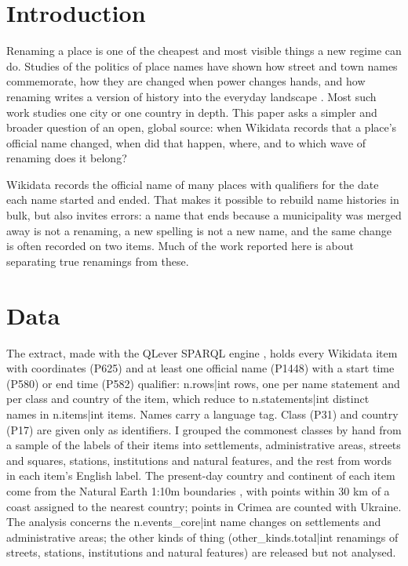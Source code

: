 \documentclass[11pt,a4paper]{article}
\begin{document}
\section{Introduction}
Renaming a place is one of the cheapest and most visible things a new regime can do. Studies of the politics of place names have shown how street and town names commemorate, how they are changed when power changes hands, and how renaming writes a version of history into the everyday landscape \citep{azaryahu1996,roseredwood2010,light2004}. Most such work studies one city or one country in depth. This paper asks a simpler and broader question of an open, global source: when Wikidata records that a place's official name changed, when did that happen, where, and to which wave of renaming does it belong?

Wikidata \citep{wikidata} records the official name of many places with qualifiers for the date each name started and ended. That makes it possible to rebuild name histories in bulk, but also invites errors: a name that ends because a municipality was merged away is not a renaming, a new spelling is not a new name, and the same change is often recorded on two items. Much of the work reported here is about separating true renamings from these.

\section{Data}
The extract, made with the QLever SPARQL engine \citep{qlever}, holds every Wikidata item with coordinates (P625) and at least one official name (P1448) with a start time (P580) or end time (P582) qualifier: {{n.rows|int}} rows, one per name statement and per class and country of the item, which reduce to {{n.statements|int}} distinct names in {{n.items|int}} items. Names carry a language tag. Class (P31) and country (P17) are given only as identifiers. I grouped the commonest classes by hand from a sample of the labels of their items into settlements, administrative areas, streets and squares, stations, institutions and natural features, and the rest from words in each item's English label. The present-day country and continent of each item come from the Natural Earth 1:10m boundaries \citep{naturalearth}, with points within 30 km of a coast assigned to the nearest country; points in Crimea are counted with Ukraine. The analysis concerns the {{n.events_core|int}} name changes on settlements and administrative areas; the other kinds of thing ({{other_kinds.total|int}} renamings of streets, stations, institutions and natural features) are released but not analysed.
\end{document}
